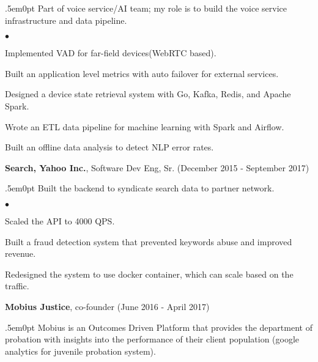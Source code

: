 \documentclass[margin, line, 10pt]{res}
\newenvironment{list2}{
  \begin{list}{$\bullet$}{%
      \setlength{\itemsep}{0in}
      \setlength{\parsep}{0in} \setlength{\parskip}{0in}
      \setlength{\topsep}{0in} \setlength{\partopsep}{0in}
      \setlength{\leftmargin}{0.2in}}}{\end{list}}
\begin{document}
\begin{resume}
\begin{adjustwidth}{.5em}{0pt}
  \vspace{-.3cm}
  Part of voice service/AI team; my role is to build the voice service infrastructure and data pipeline.

  \begin{list2}
    \vspace{.2cm}
  \item Implemented VAD for far-field devices(WebRTC based).
  \item Built an application level metrics with auto failover for external services.
  \item Designed a device state retrieval system with Go, Kafka, Redis, and Apache Spark.
  \item Wrote an ETL data pipeline for machine learning with Spark and Airflow.
  \item Built an offline data analysis to detect NLP error rates.
  \end{list2}
  \vspace{.05cm}
\end{adjustwidth}

{\Large {\bf Search, Yahoo Inc.}}, Software Dev Eng, Sr. \hfill (December 2015 - September 2017)\\
\begin{adjustwidth}{.5em}{0pt}
  \vspace{-.3cm}
  Built the backend to syndicate search data to partner network.
  \begin{list2}
  \vspace{.2cm}
  \item Scaled the API to 4000 QPS.
  \item Built a fraud detection system that prevented keywords abuse and improved revenue.
  \item Redesigned the system to use docker container, which can scale based on the traffic.
  \end{list2}
  \vspace{.05cm}
\end{adjustwidth}

\vspace{.05cm}

{\Large {\bf Mobius Justice}}, co-founder \hfill (June 2016 - April 2017)\\
\begin{adjustwidth}{.5em}{0pt}
  \vspace{-.3cm}
  Mobius is an Outcomes Driven Platform that provides the department of probation with insights
into the performance of their client population (google analytics for juvenile probation system).


\end{adjustwidth}
\end{resume}
\end{document}
